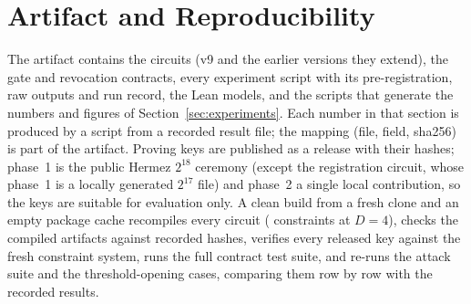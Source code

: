 \section{Artifact and Reproducibility}
\label{app:artifact}
The artifact contains the circuits (v9 and the earlier versions they extend), the gate and revocation contracts, every experiment script with its
pre-registration, raw outputs and run record, the Lean models, and the scripts that generate the numbers and figures of
Section~\ref{sec:experiments}. Each number in that section is produced by a script from a recorded result file; the mapping (file, field,
sha256) is part of the artifact.
Proving keys are published as a release with their hashes; phase~1 is the public Hermez $2^{18}$ ceremony (except the registration circuit, whose phase~1 is a locally generated $2^{17}$ file)
and phase~2 a single local contribution, so the keys are suitable for evaluation only.
A clean build from a fresh clone and an empty package cache recompiles every circuit (\NConsVnineD{} constraints at $D=4$), checks the compiled
artifacts against recorded hashes, verifies every released key against the fresh constraint system, runs the full contract test suite, and re-runs
the attack suite and the threshold-opening cases, comparing them row by row with the recorded results.
